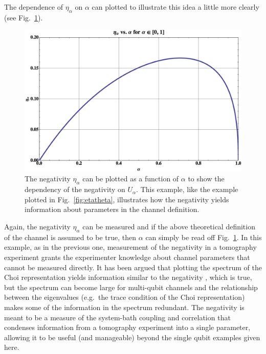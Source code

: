 The dependence of $\eta_\alpha$ on $\alpha$ can plotted to illustrate this idea a little more clearly (see Fig.\ \ref{fig:etaalpha}).     
\begin{figure}[h!t]
\centering
\includegraphics[scale=0.35]{etaalphaII.png}
\caption{The negativity $\eta_\alpha$ can be plotted as a function of $\alpha$ to show the dependency of the negativity on $U_\alpha$.  This example, like the example plotted in Fig.\ \ref{fig:etatheta}, illustrates how the negativity yields information about parameters in the channel definition.}
\label{fig:etaalpha}
\end{figure}   

Again, the negativity $\eta_\alpha$ can be measured and if the above theoretical definition of the channel is assumed to be true, then $\alpha$ can simply be read off Fig.\ \ref{fig:etaalpha}.  In this example, as in the previous one, measurement of the negativity in a tomography experiment grants the experimenter knowledge about channel parameters that cannot be measured directly.  It has been argued that plotting the spectrum of the Choi representation yields information similar to the negativity \cite{Rodriguez2008}, which is true, but the spectrum can become large for multi-qubit channels and the relationship between the eigenvalues (e.g.\ the trace condition of the Choi representation) makes some of the information in the spectrum redundant.  The negativity is meant to be a measure of the system-bath coupling and correlation that condenses information from a tomography experiment into a single parameter, allowing it to be useful (and manageable) beyond the single qubit examples given here.

